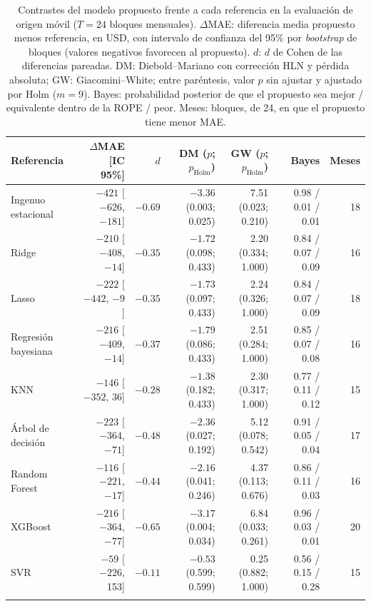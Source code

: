 \documentclass[pdflatex,sn-mathphys-num]{sn-jnl}
\begin{document}
\begin{table}[!htb]
\caption{Contrastes del modelo propuesto frente a cada referencia en la evaluación de origen móvil ($T=24$ bloques mensuales). $\Delta$MAE: diferencia media propuesto menos referencia, en USD, con intervalo de confianza del 95\% por \emph{bootstrap} de bloques (valores negativos favorecen al propuesto). $d$: $d$ de Cohen de las diferencias pareadas. DM: Diebold--Mariano con corrección HLN y pérdida absoluta; GW: Giacomini--White; entre paréntesis, valor $p$ sin ajustar y ajustado por Holm ($m=9$). Bayes: probabilidad posterior de que el propuesto sea mejor / equivalente dentro de la ROPE / peor. Meses: bloques, de 24, en que el propuesto tiene menor MAE.}\label{tab:pruebas}
\scriptsize
\begin{tabular*}{\textwidth}{@{\extracolsep\fill}lrrrrrr}
\toprule
Referencia & $\Delta$MAE [IC 95\%] & $d$ & DM ($p$; $p_{\mathrm{Holm}}$) & GW ($p$; $p_{\mathrm{Holm}}$) & Bayes & Meses \\
\midrule
Ingenuo estacional & $-421$ [$-626$, $-181$] & $-0.69$ & $-3.36$ (0.003; 0.025) & 7.51 (0.023; 0.210) & 0.98 / 0.01 / 0.01 & 18 \\
Ridge & $-210$ [$-408$, $-14$] & $-0.35$ & $-1.72$ (0.098; 0.433) & 2.20 (0.334; 1.000) & 0.84 / 0.07 / 0.09 & 16 \\
Lasso & $-222$ [$-442$, $-9$] & $-0.35$ & $-1.73$ (0.097; 0.433) & 2.24 (0.326; 1.000) & 0.84 / 0.07 / 0.09 & 18 \\
Regresión bayesiana & $-216$ [$-409$, $-14$] & $-0.37$ & $-1.79$ (0.086; 0.433) & 2.51 (0.284; 1.000) & 0.85 / 0.07 / 0.08 & 16 \\
KNN & $-146$ [$-352$, 36] & $-0.28$ & $-1.38$ (0.182; 0.433) & 2.30 (0.317; 1.000) & 0.77 / 0.11 / 0.12 & 15 \\
Árbol de decisión & $-223$ [$-364$, $-71$] & $-0.48$ & $-2.36$ (0.027; 0.192) & 5.12 (0.078; 0.542) & 0.91 / 0.05 / 0.04 & 17 \\
Random Forest & $-116$ [$-221$, $-17$] & $-0.44$ & $-2.16$ (0.041; 0.246) & 4.37 (0.113; 0.676) & 0.86 / 0.11 / 0.03 & 16 \\
XGBoost & $-216$ [$-364$, $-77$] & $-0.65$ & $-3.17$ (0.004; 0.034) & 6.84 (0.033; 0.261) & 0.96 / 0.03 / 0.01 & 20 \\
SVR & $-59$ [$-226$, 153] & $-0.11$ & $-0.53$ (0.599; 0.599) & 0.25 (0.882; 1.000) & 0.56 / 0.15 / 0.28 & 15 \\
\botrule
\end{tabular*}
\end{table}
\end{document}
